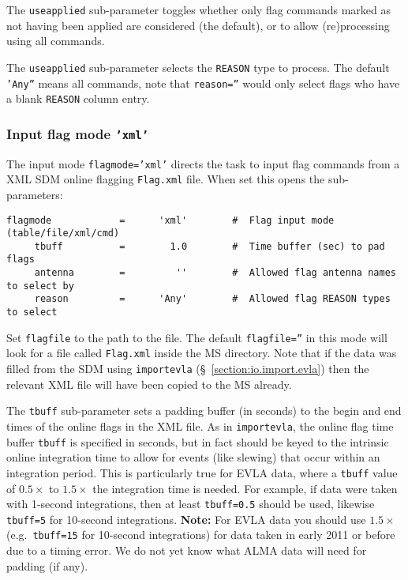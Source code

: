 The {\tt useapplied} sub-parameter toggles whether only flag commands
marked as not having been applied are considered (the default), or
to allow (re)processing using all commands.

The {\tt useapplied} sub-parameter selects the {\tt REASON} type to
process.  The default {\tt 'Any''} means all commands, note that
{\tt reason=''} would only select flags who have a blank {\tt REASON}
column entry.

\subsubsection{Input flag mode {\tt 'xml'}}
\label{section:edit.flagcmd.flagmode.xml}

The input mode {\tt flagmode='xml'} directs the
task to input flag commands from a XML SDM online flagging 
{\tt Flag.xml} file.  
When set this opens the sub-parameters:
\small
\begin{verbatim}
flagmode            =      'xml'        #  Flag input mode (table/file/xml/cmd)
     tbuff          =        1.0        #  Time buffer (sec) to pad flags
     antenna        =         ''        #  Allowed flag antenna names to select by
     reason         =      'Any'        #  Allowed flag REASON types to select
\end{verbatim}
\normalsize
Set {\tt flagfile} to the path to the file.  The default 
{\tt flagfile=''} in this mode will look for a file called 
{\tt Flag.xml} inside the MS directory.  Note that if the
data was filled from the SDM using {\tt importevla}
(\S~\ref{section:io.import.evla}) then the relevant XML file
will have been copied to the MS already.

The {\tt tbuff} sub-parameter sets a padding buffer (in seconds)
to the begin and end times of the online flags in the XML file.
As in {\tt importevla}, the online flag time buffer {\tt tbuff} is specified in
seconds, but in fact should be keyed to the intrinsic online 
integration time to allow for events (like slewing) that occur
within an integration period.  This is particularly true for EVLA data,
where a {\tt tbuff} value of $0.5\times$ to $1.5\times$ the
integration time is needed.  For example, if data were taken with
1-second integrations, then at least {\tt tbuff=0.5} should be used,
likewise {\tt tbuff=5} for 10-second integrations.
{\bf Note:} For EVLA data you should use $1.5\times$ (e.g.\ 
{\tt tbuff=15} for 10-second integrations) for data taken in 
early 2011 or before due to a timing error.  We do not yet know what
ALMA data will need for padding (if any).

